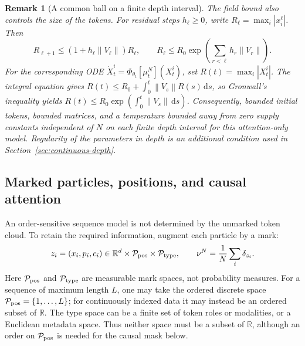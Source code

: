 \documentclass[11pt]{amsart}
\numberwithin{equation}{section}
\theoremstyle{plain}
\newtheorem{remark}[theorem]{Remark}
\newcommand{\R}{\mathbb{R}}
\newcommand{\dd}{\,\mathrm{d}}
\newcommand{\abs}[1]{\left\lvert#1\right\rvert}
\newcommand{\norm}[1]{\left\lVert#1\right\rVert}
\begin{document}
\begin{remark}[A common ball on a finite depth interval]
The field bound also controls the size of the tokens.  For residual steps
$h_\ell\geq0$, write $R_\ell=\max_i\abs{x_i^\ell}$.  Then
\[
 R_{\ell+1}\leq(1+h_\ell\norm{V_\ell})R_\ell,
 \qquad
 R_\ell\leq R_0\exp\!\left(\sum_{r<\ell}h_r\norm{V_r}\right).
\]
For the corresponding ODE
$\dot X_t^i=\Phi_{\theta_t}[\mu_t^N](X_t^i)$, set
$R(t)=\max_i\abs{X_t^i}$.  The integral equation gives
$R(t)\leq R_0+\int_0^t\norm{V_s}R(s)\dd s$, so Gronwall's inequality yields
$R(t)\leq R_0\exp(\int_0^t\norm{V_s}\dd s)$.
Consequently, bounded initial tokens, bounded matrices, and a temperature
bounded away from zero supply constants independent of $N$ on each finite
depth interval for this attention-only model.  Regularity of the parameters
in depth is an additional condition used in Section~\ref{sec:continuous-depth}.
\end{remark}

\subsection{Marked particles, positions, and causal attention}
An order-sensitive sequence model is not determined by the unmarked token
cloud.  To retain the required information, augment each particle by a mark:
\[
  z_i=(x_i,p_i,c_i)\in
  \R^d\times\mathcal P_{\rm pos}\times\mathcal P_{\rm type},\qquad
  \nu^N=\frac1N\sum_i\delta_{z_i}.
\]
Here $\mathcal P_{\rm pos}$ and $\mathcal P_{\rm type}$ are measurable
mark spaces, not probability measures.  For a sequence of maximum length
$L$, one may take the ordered discrete space
$\mathcal P_{\rm pos}=\{1,\ldots,L\}$; for continuously indexed data it may
instead be an ordered subset of $\R$.  The type space can be a finite set of
token roles or modalities, or a Euclidean metadata space.  Thus neither space
must be a subset of $\R$, although an order on $\mathcal P_{\rm pos}$ is
needed for the causal mask below.
\end{document}
